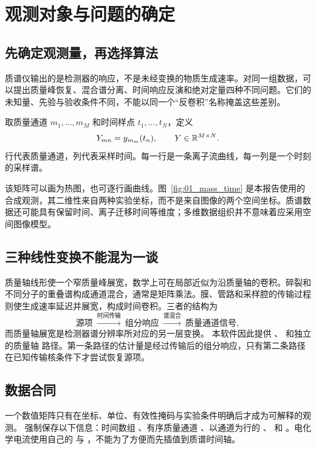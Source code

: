 \chapter{观测对象与问题的确定}
\section{先确定观测量，再选择算法}
质谱仪输出的是检测器的响应，不是未经变换的物质生成速率。对同一组数据，可以提出质量峰恢复、混合谱分离、时间响应反演和绝对定量四种不同问题。它们的未知量、先验与验收条件不同，不能以同一个“反卷积”名称掩盖这些差别。

\begin{definition}[质谱观测矩阵]
取质量通道 $m_1,\ldots,m_M$ 和时间样点 $t_1,\ldots,t_N$，定义
\begin{equation}
Y_{mn}=y_{m_m}(t_n),\qquad Y\in\mathbb{R}^{M\times N}.
\end{equation}
行代表质量通道，列代表采样时间。每一行是一条离子流曲线，每一列是一个时刻的采样谱。
\end{definition}
该矩阵可以画为热图，也可逐行画曲线。图~\ref{fig:01_mass_time} 是本报告使用的合成观测，其二维性来自两种实验坐标，而不是来自图像的两个空间坐标。质谱数据还可能具有保留时间、离子迁移时间等维度；多维数据组织并不意味着应采用空间图像模型\cite{deimos}。

\section{三种线性变换不能混为一谈}
质量轴线形使一个窄质量峰展宽，数学上可在局部近似为沿质量轴的卷积。碎裂和不同分子的重叠谱构成通道混合，通常是矩阵乘法。膜、管路和采样腔的传输过程则使生成速率延迟并展宽，构成时间卷积。三者的结构为
\begin{equation}
\text{源项}\ \xrightarrow{\text{时间传输}}\ \text{组分响应}
\ \xrightarrow{\text{谱混合}}\ \text{质量通道信号},
\end{equation}
而质量轴展宽是检测器谱分辨率所对应的另一层变换。
本软件因此提供 、 和独立的质量轴  路径。第一条路径的估计量是经过传输后的组分响应，只有第二条路径在已知传输核条件下才尝试恢复源项。

\section{数据合同}
一个数值矩阵只有在坐标、单位、有效性掩码与实验条件明确后才成为可解释的观测。 强制保存以下信息：时间数组 、有序质量通道 、以通道为行的 、 和 。电化学电流使用自己的  与 ，不能为了方便而先插值到质谱时间轴。

